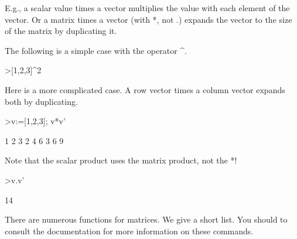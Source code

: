 \documentclass{article}
\begin{document}
\begin{eulernotebook}
\begin{eulercomment}
\begin{eulercomment}
\begin{eulercomment}
\begin{eulercomment}
\begin{eulercomment}
\begin{eulercomment}
\begin{eulercomment}
E.g., a scalar value times a vector multiplies the value with each element of
the vector. Or a matrix times a vector (with *, not .) expands the vector to
the size of the matrix by duplicating it.

The following is a simple case with the operator \textasciicircum{}.
\end{eulercomment}
\begin{eulerprompt}
>[1,2,3]^2
\end{eulerprompt}
\begin{euleroutput}
  [1,  4,  9]
\end{euleroutput}
\begin{eulercomment}
Here is a more complicated case. A row vector times a column vector expands
both by duplicating.
\end{eulercomment}
\begin{eulerprompt}
>v:=[1,2,3]; v*v'
\end{eulerprompt}
\begin{euleroutput}
              1             2             3 
              2             4             6 
              3             6             9 
\end{euleroutput}
\begin{eulercomment}
Note that the scalar product uses the matrix product, not the *!
\end{eulercomment}
\begin{eulerprompt}
>v.v'
\end{eulerprompt}
\begin{euleroutput}
  14
\end{euleroutput}
\begin{eulercomment}
There are numerous functions for matrices. We give a short list. You should to consult
the documentation for more information on these commands.


\end{eulercomment}
\end{eulercomment}
\end{eulercomment}
\end{eulercomment}
\end{eulercomment}
\end{eulercomment}
\end{eulercomment}
\end{eulernotebook}
\end{document}
